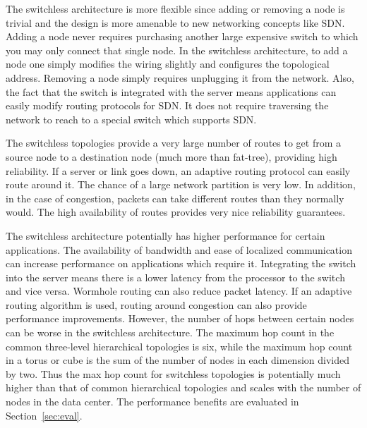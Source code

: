 The switchless architecture is more flexible since adding or removing a node is trivial and the design is more amenable to new networking concepts like SDN.  Adding a node never requires purchasing another large expensive switch to which you may only connect that single node.  In the switchless architecture, to add a node one simply modifies the wiring slightly and configures the topological address.  Removing a node simply requires unplugging it from the network.  Also, the fact that the switch is integrated with the server means applications can easily modify routing protocols for SDN.  It does not require traversing the network to reach to a special switch which supports SDN.

The switchless topologies provide a very large number of routes to get from a source node to a destination node (much more than fat-tree), providing high reliability.  If a server or link goes down, an adaptive routing protocol can easily route around it.  The chance of a large network partition is very low.  In addition, in the case of congestion, packets can take different routes than they normally would.  The high availability of routes provides very nice reliability guarantees.

The switchless architecture potentially has higher performance for certain applications.  The availability of bandwidth and ease of localized communication can increase performance on applications which require it.  Integrating the switch into the server means there is a lower latency from the processor to the switch and vice versa.  Wormhole routing can also reduce packet latency.  If an adaptive routing algorithm is used, routing around congestion can also provide performance improvements.  However, the number of hops between certain nodes can be worse in the switchless architecture.  The maximum hop count in the common three-level hierarchical topologies is six, while the maximum hop count in a torus or cube is the sum of the number of nodes in each dimension divided by two.  Thus the max hop count for switchless topologies is potentially much higher than that of common hierarchical topologies and scales with the number of nodes in the data center.  The performance benefits are evaluated in Section~\ref{sec:eval}.
